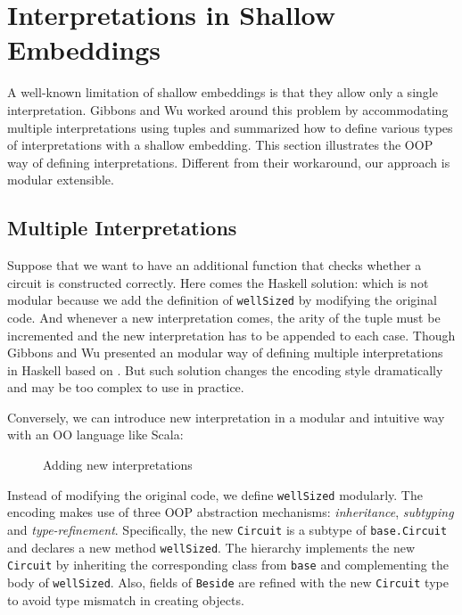 \section{Interpretations in Shallow Embeddings}

A well-known limitation of shallow embeddings is that they allow only a single
interpretation. Gibbons and Wu worked around this problem by accommodating
multiple interpretations using tuples and summarized how to define various types
of interpretations with a shallow embedding.
This section illustrates the OOP way of defining interpretations. Different from
their workaround, our approach is modular extensible.

\subsection{Multiple Interpretations}
Suppose that we want to have an additional function that checks whether a circuit is
constructed correctly. Here comes the Haskell solution:
which is not modular because we add the definition of \lstinline{wellSized} by
modifying the original code. And whenever a new interpretation comes,
the arity of the tuple must be incremented and the new interpretation has to be
appended to each case.
Though Gibbons and Wu presented an modular way of defining multiple
interpretations in Haskell based on
\cite{swierstra2008data}. But such solution changes the encoding style
dramatically and may be too complex to use in practice.

Conversely, we can introduce new interpretation in a
modular and intuitive way with an OO language like Scala:
\begin{figure}
\caption{Adding new interpretations}
\label{code:operation}
\end{figure}
Instead of modifying the original code, we define \lstinline{wellSized} modularly.
The encoding makes use of three OOP abstraction mechanisms:
\emph{inheritance}, \emph{subtyping} and \emph{type-refinement}.
Specifically, the new \lstinline{Circuit} is a subtype of
\lstinline{base.Circuit} and declares a new method \lstinline{wellSized}.
The hierarchy implements the new \lstinline{Circuit} by inheriting the corresponding class
from \lstinline{base} and
complementing the body of \lstinline{wellSized}.
Also, fields of \lstinline{Beside} are refined with the new \lstinline{Circuit}
type to avoid type mismatch in creating objects.



